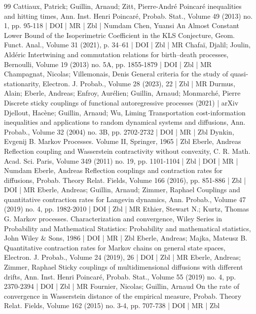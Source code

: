 \documentclass[10pt]{amsart}
\theoremstyle{definition}\newtheorem{defi}[theo]{Definition}\newtheorem{rema}[theo]{Remark}\newtheorem{exam}[theo]{Example}\newtheorem{exem}[theo]{Example}\newtheorem{nota}[theo]{Notation}
\newcommand{\1}{\mathbbm{1}}
\begin{document}
\begin{thebibliography}{99}
 Cattiaux, Patrick; Guillin, Arnaud; Zitt, Pierre-André Poincaré inequalities and hitting times, Ann. Inst. Henri Poincaré, Probab. Stat., Volume 49 (2013) no. 1, pp. 95-118 | DOI | MR | Zbl | Numdam
 Chen, Yuansi An Almost Constant Lower Bound of the Isoperimetric Coefficient in the KLS Conjecture, Geom. Funct. Anal., Volume 31 (2021), p. 34–61 | DOI | Zbl | MR
 Chafaï, Djalil; Joulin, Aldéric Intertwining and commutation relations for birth–death processes, Bernoulli, Volume 19 (2013) no. 5A, pp. 1855-1879 | DOI | Zbl | MR
 Champagnat, Nicolas; Villemonais, Denis General criteria for the study of quasi-stationarity, Electron. J. Probab., Volume 28 (2023), 22 | Zbl | MR
 Durmus, Alain; Eberle, Andreas; Enfroy, Aurélien; Guillin, Arnaud; Monmarché, Pierre Discrete sticky couplings of functional autoregressive processes (2021) | arXiv
 Djellout, Hacène; Guillin, Arnaud; Wu, Liming Transportation cost-information inequalities and applications to random dynamical systems and diffusions, Ann. Probab., Volume 32 (2004) no. 3B, pp. 2702-2732 | DOI | MR | Zbl
 Dynkin, Evgenij B. Markov Processes. Volume II, Springer, 1965 | Zbl
 Eberle, Andreas Reflection coupling and Wasserstein contractivity without convexity, C. R. Math. Acad. Sci. Paris, Volume 349 (2011) no. 19, pp. 1101-1104 | Zbl | DOI | MR | Numdam
 Eberle, Andreas Reflection couplings and contraction rates for diffusions, Probab. Theory Relat. Fields, Volume 166 (2016), pp. 851-886 | Zbl | DOI | MR
 Eberle, Andreas; Guillin, Arnaud; Zimmer, Raphael Couplings and quantitative contraction rates for Langevin dynamics, Ann. Probab., Volume 47 (2019) no. 4, pp. 1982-2010 | DOI | Zbl | MR
 Ethier, Stewart N.; Kurtz, Thomas G. Markov processes. Characterization and convergence, Wiley Series in Probability and Mathematical Statistics: Probability and mathematical statistics, John Wiley \& Sons, 1986 | DOI | MR | Zbl
 Eberle, Andreas; Majka, Mateusz B. Quantitative contraction rates for Markov chains on general state spaces, Electron. J. Probab., Volume 24 (2019), 26 | DOI | Zbl | MR
 Eberle, Andreas; Zimmer, Raphael Sticky couplings of multidimensional diffusions with different drifts, Ann. Inst. Henri Poincaré, Probab. Stat., Volume 55 (2019) no. 4, pp. 2370-2394 | DOI | Zbl | MR
 Fournier, Nicolas; Guillin, Arnaud On the rate of convergence in Wasserstein distance of the empirical measure, Probab. Theory Relat. Fields, Volume 162 (2015) no. 3-4, pp. 707-738 | DOI | MR | Zbl

\end{thebibliography}
\end{document}
